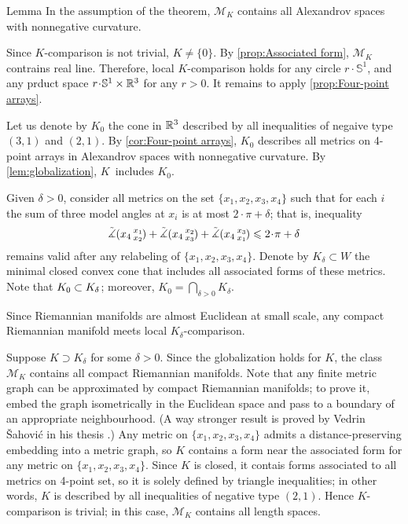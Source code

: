 \documentclass[a4paper,10pt]{article}
\begin{document}
\begin{thm}{Lemma}\label{lem:globalization}
In the assumption of the theorem, $\mathcal{M}_K$ contains all Alexandrov spaces with nonnegative curvature.
\end{thm}

Since $K$-comparison is not trivial, $K\ne\{0\}$.
By \ref{prop:Associated form}, $\mathcal{M}_K$ contrains real line.
Therefore, local $K$-comparison holds for any circle $r\cdot \mathbb{S}^1$, and any prduct space $r\cdot \mathbb{S}^1\times\RR^3$ for any $r>0$.
It remains to apply \ref{prop:Four-point arrays}.
\qeds

Let us denote by $K_0$ the cone in $\mathbb{R}^3$ described by all inequalities of negaive type $(3,1)$ and $(2,1)$.
By \ref{cor:Four-point arrays}, $K_0$ describes all metrics on 4-point arrays in Alexandrov spaces with nonnegative curvature.
By \ref{lem:globalization},  $K$~includes $K_0$.

Given $\delta>0$, consider all metrics on the set $\{x_1,x_2,x_3,x_4\}$ such that for each $i$
the sum of three model angles at $x_i$ is at most $2\cdot\pi+\delta$; that is, inequality
\[\angk{x_4}{x_1}{x_2}+\angk{x_4}{x_2}{x_3}+\angk{x_4}{x_3}{x_1}\le 2\cdot\pi+\delta\]
remains valid after any relabeling of $\{x_1,x_2,x_3,x_4\}$.
Denote by $K_\delta\subset W$ the minimal closed convex cone that includes all associated forms of these metrics.
Note that $K_0\z\subset K_\delta$;
moreover, $K_0=\bigcap_{\delta>0} K_\delta$.

Since Riemannian manifolds are almost Euclidean at small scale,
any compact Riemannian manifold meets local $K_\delta$-comparison.

Suppose $K\supset K_\delta$ for some $\delta>0$.
Since the globalization holds for $K$, the class $\mathcal{M}_K$ contains all compact Riemannian manifolds.
Note that any finite metric graph can be approximated by compact Riemannian manifolds;
to prove it, embed the graph isometrically in the Euclidean space and pass to a boundary of an appropriate neighbourhood.
(A way stronger result is proved by Vedrin Šahović in his thesis \cite{sahovic2009}.)
Any metric on $\{x_1,x_2,x_3,x_4\}$ admits a distance-preserving embedding into a metric graph, so $K$ contains a form near the associated form for any metric on $\{x_1,x_2,x_3,x_4\}$.
Since $K$ is closed, it contais forms associated to all metrics on 4-point set, so it is solely defined by triangle inequalities;
in other words, $K$ is described by all inequalities of negative type $(2,1)$.
Hence $K$-comparison is trivial; in this case, $\mathcal{M}_K$ contains all length spaces.
\end{document}
